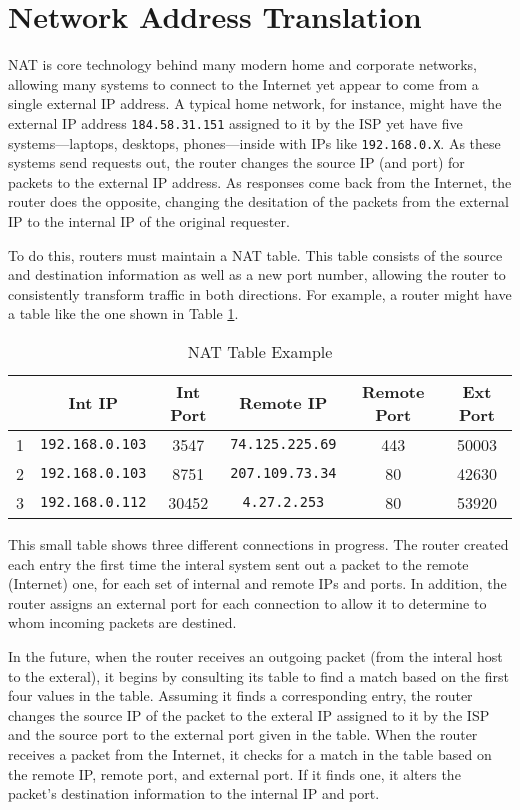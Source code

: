 \section{Network Address Translation}
\label{sec:nat}
\par \ac{NAT} is core technology behind many modern home and corporate networks, allowing many systems to connect to the Internet yet appear to come from a single external \ac{IP} address. A typical home network, for instance, might have the external IP address \texttt{184.58.31.151} assigned to it by the \ac{ISP} yet have five systems---laptops, desktops, phones---inside with IPs like \texttt{192.168.0.X}. As these systems send requests out, the router changes the source IP (and port) for packets to the external IP address. As responses come back from the Internet, the router does the opposite, changing the desitation of the packets from the external IP to the internal IP of the original requester.

\par To do this, routers must maintain a \ac{NAT} table. This table consists of the source and destination information as well as a new port number, allowing the router to consistently transform traffic in both directions. For example, a router might have a table like the one shown in Table \ref{tab:nat_example}.

\begin{table}
\caption{NAT Table Example}
\label{tab:nat_example}
\centering
\begin{tabular}{r|ccccc}
  & Int IP & Int Port & Remote IP & Remote Port & Ext Port\\
\hline
1 & \texttt{192.168.0.103} & 3547 & \texttt{74.125.225.69} & 443 & 50003\\
2 & \texttt{192.168.0.103} & 8751 & \texttt{207.109.73.34} & 80 & 42630\\
3 & \texttt{192.168.0.112} & 30452 & \texttt{4.27.2.253} & 80 & 53920
\end{tabular}
\end{table}

\par This small table shows three different connections in progress. The router created each entry the first time the interal system sent out a packet to the remote (Internet) one, for each set of internal and remote IPs and ports. In addition, the router assigns an external port for each connection to allow it to determine to whom incoming packets are destined.

\par In the future, when the router receives an outgoing packet (from the interal host to the exteral), it begins by consulting its table to find a match based on the first four values in the table. Assuming it finds a corresponding entry, the router changes the source IP of the packet to the exteral IP assigned to it by the \ac{ISP} and the source port to the external port given in the table. When the router receives a packet from the Internet, it checks for a match in the table based on the remote IP, remote port, and external port. If it finds one, it alters the packet's destination information to the internal IP and port.

